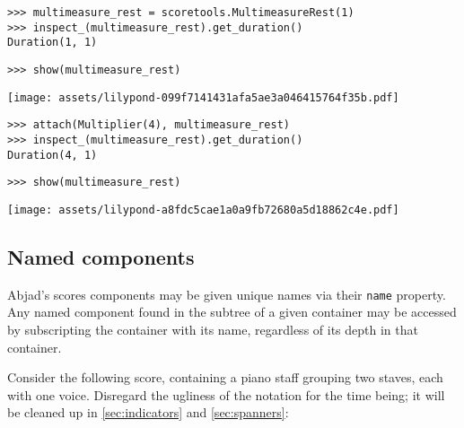 \begin{abjadbookoutput}
\begin{singlespacing}
\vspace{-0.5\baselineskip}
\begin{verbatim}
>>> multimeasure_rest = scoretools.MultimeasureRest(1)
>>> inspect_(multimeasure_rest).get_duration()
Duration(1, 1)
\end{verbatim}
\begin{verbatim}
>>> show(multimeasure_rest)
\end{verbatim}
\noindent\texttt{[image: assets/lilypond-099f7141431afa5ae3a046415764f35b.pdf]}
\begin{verbatim}
>>> attach(Multiplier(4), multimeasure_rest)
>>> inspect_(multimeasure_rest).get_duration()
Duration(4, 1)
\end{verbatim}
\begin{verbatim}
>>> show(multimeasure_rest)
\end{verbatim}
\noindent\texttt{[image: assets/lilypond-a8fdc5cae1a0a9fb72680a5d18862c4e.pdf]}
\end{singlespacing}
\end{abjadbookoutput}

\subsection{Named components}
\label{ssec:named-components}

Abjad's scores components may be given unique names via their \texttt{name}
property. Any named component found in the subtree of a given container may be
accessed by subscripting the container with its name, regardless of its depth
in that container.

Consider the following score, containing a piano staff grouping two staves,
each with one voice. Disregard the ugliness of the notation for the time being;
it will be cleaned up in \autoref{sec:indicators} and \autoref{sec:spanners}:

\begin{comment}
<abjad>
voice_1 = Voice(name='Voice 1')
voice_1.append(Measure((3, 4), "d'4.. b'16 af'4"))
voice_1.append(Measure((5, 4), "af'4. g'8 c''8 b'4. b'8 r16 d''16"))
upper_staff = Staff(
    [voice_1],
    name='Upper Staff',
    )
voice_2 = Voice(name='Voice 2')
voice_2.append(Measure((3, 4), "r8 c'8 r8 d8 r8 e8"))
voice_2.append(Measure((5, 4), r"r4 \times 2/3 { g4 fs4 e8 cs8 } r4. fs8"))
lower_staff = Staff(
    [voice_2],
    name='Lower Staff',
    )
staff_group = StaffGroup(
    [upper_staff, lower_staff],
    context_name='PianoStaff',
    name='Both Staves',
    )
score = Score([staff_group])
show(score)
</abjad>
\end{comment}


